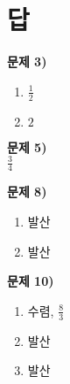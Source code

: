 \documentclass{oblivoir}
\newcounter{num}
\newcommand\an[1]{\par\bigskip\noindent\textbf{문제 #1)}\\}
\let\oldsection\section
\renewcommand\section{\clearpage\oldsection}
\begin{document}
\section*{답}

%
\an{3}
\begin{enumerate}[itemsep=0pt,topsep=0pt]
\item
\(\frac12\)
\item
\(2\)
\end{enumerate}

%
\an{5}
\(\frac34\)

%
\an{8}
\begin{enumerate}[itemsep=0pt,topsep=0pt]
\item
발산
\item
발산
\end{enumerate}

%
\an{10}
\begin{enumerate}[itemsep=0pt,topsep=0pt]
\item
수렴, \(\frac83\)
\item
발산
\item
발산
\end{enumerate}
\end{document}
